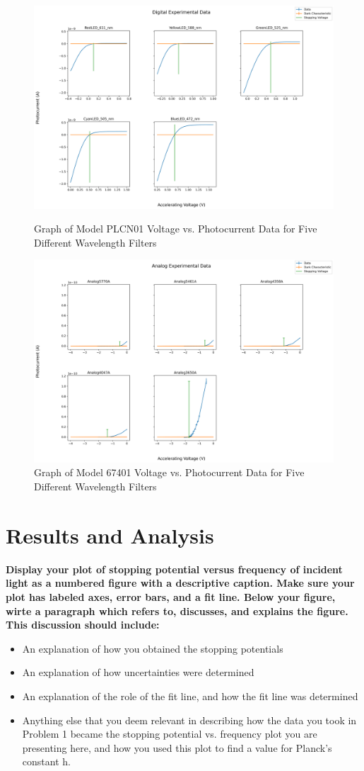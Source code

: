 \documentclass[prX,nofootinbib,notitlepage]{revtex4-1}
\begin{document}
\begin{figure}[ht!]
    \centering
    \includegraphics[width=0.75\linewidth]{Digital_Data_2x3.png}
    \caption{Graph of Model PLCN01 Voltage vs. Photocurrent Data for Five Different Wavelength Filters}
    \label{fig:digital_data}
    \includegraphics[width=0.75\linewidth]{Analog_Data_2x3.png}
    \caption{Graph of Model 67401 Voltage vs. Photocurrent Data for Five Different Wavelength Filters}
    \label{fig:analog_data}
\end{figure}

\pagebreak
\section{Results and Analysis}

\textbf{Display your plot of stopping potential versus frequency of incident light as a numbered figure with a descriptive caption. Make sure your plot has labeled axes, error bars, and a fit line. Below your figure, wirte a paragraph which refers to, discusses, and explains the figure. This discussion should include:}
\begin{itemize}
    \item An explanation of how you obtained the stopping potentials 
    \item An explanation of how uncertainties were determined
    \item An explanation of the role of the fit line, and how the fit line was determined
    \item Anything else that you deem relevant in describing how the data you took in Problem 1 became the stopping potential vs. frequency plot you are presenting here, and how you used this plot to find a value for Planck's constant h. 
\end{itemize}
\end{document}
